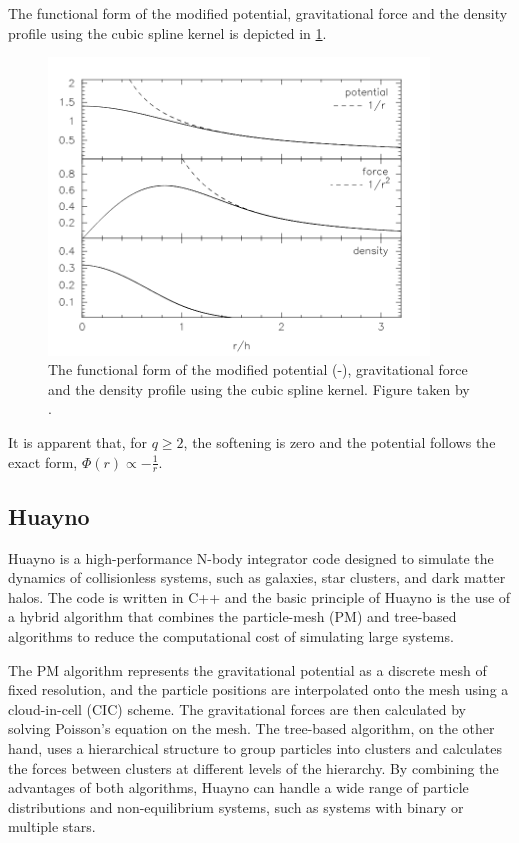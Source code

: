 The functional form of the modified potential, gravitational force and the density profile using the cubic spline kernel is depicted in \cref{fig:smoothened_gravity}.
\begin{figure}[H]
    \centering
    \includegraphics[width=0.9\textwidth]{Thesis/figures/smoothening.pdf}
    \caption{The functional form of the modified potential (-), gravitational force and the density profile using the cubic spline kernel. Figure taken by \cite{price2007energy}.}
    \label{fig:smoothened_gravity}
\end{figure}
It is apparent that, for $q \geq 2$, the softening is zero and the potential follows the exact form, $\Phi(r) \propto -\frac{1}{r}$. 


\subsection{Huayno}\label{sub:huayano}

Huayno \citep{pelupessy2012n} is a high-performance N-body integrator code designed to simulate the dynamics of collisionless systems, such as galaxies, star clusters, and dark matter halos. The code is written in C++ and the basic principle of Huayno is the use of a hybrid algorithm \citep{bode2000tree} that combines the particle-mesh (PM) \citep{klypin1983three} and tree-based algorithms \citep{barnes1986hierarchical,dehnen2000very} to reduce the computational cost of simulating large systems.


The PM algorithm represents the gravitational potential as a discrete mesh of fixed resolution, and the particle positions are interpolated onto the mesh using a cloud-in-cell (CIC) scheme. The gravitational forces are then calculated by solving Poisson's equation on the mesh. The tree-based algorithm, on the other hand, uses a hierarchical structure to group particles into clusters and calculates the forces between clusters at different levels of the hierarchy. By combining the advantages of both algorithms, Huayno can handle a wide range of particle distributions and non-equilibrium systems, such as systems with binary or multiple stars.




